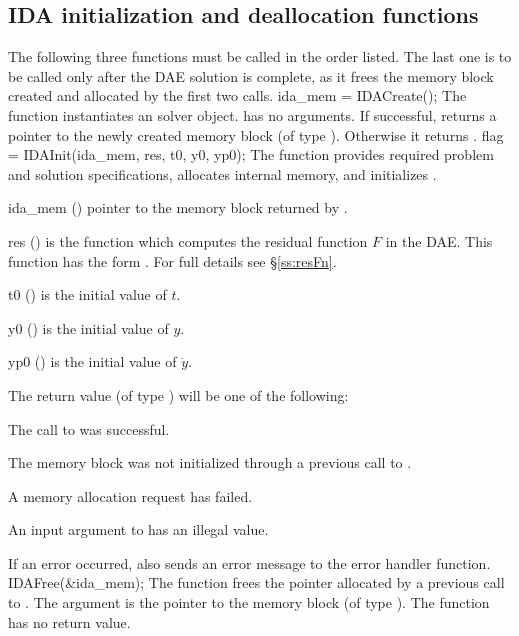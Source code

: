 \subsection{IDA initialization and deallocation functions}
\label{sss:idainit}
The following three functions must be called in the order listed. The last one
is to be called only after the DAE solution is complete, as it frees the {\ida}
memory block created and allocated by the first two calls.
{
  ida\_mem = IDACreate();
}
{
  The function  instantiates an {\ida} solver object.
}
{
   has no arguments.
}
{
  If successful,  returns a pointer to the newly created 
  {\ida} memory block (of type ).  Otherwise it returns .
}
{}
{
  flag = IDAInit(ida\_mem, res, t0, y0, yp0);
}
{
  The function  provides required problem and solution
  specifications, allocates internal memory, and initializes {\ida}.
}
{
  \begin{args}
  \item[ida\_mem] ()
    pointer to the {\ida} memory block returned by .
  \item[res] ()
    is the {\C} function which computes the residual function $F$ in the DAE.
     This function has the form .
     For full details see \S\ref{ss:resFn}.
  \item[t0] ()
    is the initial value of $t$.
  \item[y0] ()
    is the initial value of $y$. 
  \item[yp0] ()
    is the initial value of $\dot{y}$. 
  \end{args}
}
{
  The return value  (of type ) will be one of the following:
  \begin{args}
  \item[\Id{IDA\_SUCCESS}]
    The call to  was successful.
  \item[\Id{IDA\_MEM\_NULL}] 
    The {\ida} memory block was not initialized through a previous call to
    .
  \item[\Id{IDA\_MEM\_FAIL}] 
    A memory allocation request has failed.
  \item[\Id{IDA\_ILL\_INPUT}] 
    An input argument to  has an illegal value.
  \end{args}
}
{
  If an error occurred,  also sends an error message to the
  error handler function.
}
{
  IDAFree(\&ida\_mem);
}
{
  The function  frees the pointer allocated by
  a previous call to .
}
{
  The argument is the pointer to the {\ida} memory block (of type ).
}
{
  The function  has no return value.
}
{}


